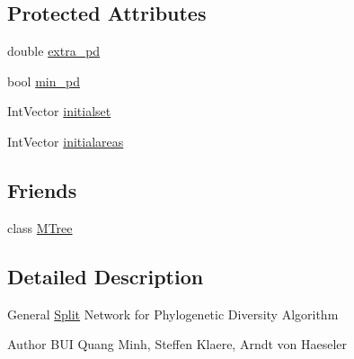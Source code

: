 \subsection*{Protected Attributes}
\begin{DoxyCompactItemize}
\item 
double \hyperlink{classPDNetwork_a0a092e4f0267eb88e6459e9e7e552b14}{extra\_\-pd}
\item 
bool \hyperlink{classPDNetwork_a2427fd91e8ae19784de05e574ea75dae}{min\_\-pd}
\item 
IntVector \hyperlink{classPDNetwork_a316ec40bb65670852e08371985d786e0}{initialset}
\item 
IntVector \hyperlink{classPDNetwork_ae82636a4b7ce25ca1604cceefc79bb6a}{initialareas}
\end{DoxyCompactItemize}
\subsection*{Friends}
\begin{DoxyCompactItemize}
\item 
\hypertarget{classPDNetwork_a7a747beac427dfc013c53501e474d452}{
class \hyperlink{classPDNetwork_a7a747beac427dfc013c53501e474d452}{MTree}}
\label{classPDNetwork_a7a747beac427dfc013c53501e474d452}

\end{DoxyCompactItemize}


\subsection{Detailed Description}
General \hyperlink{classSplit}{Split} Network for Phylogenetic Diversity Algorithm

\begin{DoxyAuthor}{Author}
BUI Quang Minh, Steffen Klaere, Arndt von Haeseler 
\end{DoxyAuthor}


